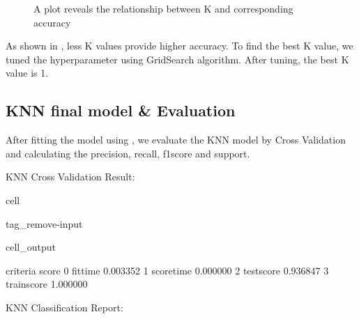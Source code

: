 \documentclass[letterpaper,10pt,english]{jupyterBook}
\let\sphinxpxdimen\pdfpxdimen\else\newdimen\sphinxpxdimen
\begin{document}
\begin{figure}[htbp]
\centering
\capstart

\noindent\sphinxincludegraphics[width=500\sphinxpxdimen]{{k_accuracy}.png}
\caption{A plot reveals the relationship between K and corresponding accuracy}\label{\detokenize{analysis:f2}}\end{figure}

\sphinxAtStartPar
As shown in {\hyperref[\detokenize{analysis:f2}]{}}, less K values provide higher accuracy. To find the best K value, we tuned the hyperparameter using GridSearch algorithm. After tuning, the best K value is 1.


\subsection{KNN final model \& Evaluation}
\label{\detokenize{analysis:knn-final-model-evaluation}}
\sphinxAtStartPar
After fitting the model using , we evaluate the KNN model by Cross Validation and calculating the precision, recall, f1\sphinxhyphen{}score and support.

\sphinxAtStartPar
KNN Cross Validation Result:

\begin{sphinxuseclass}{cell}
\begin{sphinxuseclass}{tag_remove-input}\begin{sphinxVerbatimOutput}

\begin{sphinxuseclass}{cell_output}
\begin{sphinxVerbatim}[commandchars=\\\{\}]
      criteria     score
0     fit\PYGZus{}time  0.003352
1   score\PYGZus{}time  0.000000
2   test\PYGZus{}score  0.936847
3  train\PYGZus{}score  1.000000
\end{sphinxVerbatim}

\end{sphinxuseclass}\end{sphinxVerbatimOutput}

\end{sphinxuseclass}
\end{sphinxuseclass}
\sphinxAtStartPar
KNN Classification Report:
\end{document}
